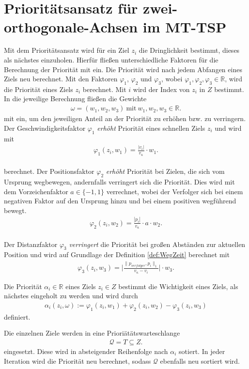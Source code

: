 \documentclass[german,version-2019-11]{uzl-thesis}
\begin{document}
\section{Prioritätsansatz für zwei-orthogonale-Achsen im MT-TSP}

Mit dem Prioritätsansatz wird für ein Ziel $z_i$ die Dringlichkeit bestimmt, dieses als nächstes einzuholen. Hierfür fließen unterschiedliche Faktoren für die Berechnung der Priorität mit ein. Die Priorität wird nach jedem Abfangen eines Ziels neu berechnet. Mit den Faktoren $\varphi_1$, $\varphi_2$ und $\varphi_3$, wobei $\varphi_1,\varphi_2,\varphi_3\in\mathbb{R}$, wird die Priorität eines Ziels $z_i$ berechnet. Mit $i$ wird der Index von $z_i$ in $Z$ bestimmt. In die jeweilige Berechnung fließen die Gewichte
\begin{align*}
\omega = (w_1, w_2 ,w_3)~\text{mit}~w_1,w_2,w_3\in\mathbb{R}.
\end{align*}
mit ein, um den jeweiligen Anteil an der Priorität zu erhöhen bzw. zu verringern.\\
Der Geschwindigkeitsfaktor $\varphi_1$ \emph{erhöht} Priorität eines schnellen Ziels $z_i$ und wird mit 
\begin{align}
\varphi_1(z_i, w_1) = \frac{|v_i|}{v_{\kappa}}\cdot w_1.
\end{align}\\
berechnet.
\label{def:FaktorPos}
Der Positionsfaktor $\varphi_2$ \emph{erhöht} Priorität bei Zielen, die sich vom Ursprung wegbewegen, andernfalls verringert sich die Priorität. Dies wird mit dem Vorzeichenfaktor $a\in\{-1,1\}$ verrechnet, wobei der Verfolger sich bei einem negativen Faktor auf den Ursprung hinzu und bei einem positiven wegführend bewegt.
\begin{align}
\varphi_2(z_i, w_2) = \frac{|p_i|}{v_{\kappa}}\cdot a \cdot w_2.
\end{align}\\
Der Distanzfaktor $\varphi_3$ \emph{verringert} die Priorität bei großen Abständen zur aktuellen Position und wird auf Grundlage der Definition \ref{def:WegZeit} berechnet mit
\begin{align}
\varphi_3(z_i, w_3) = \bigg\vert\frac{\|p_{verfolger},p_i\|_1}{v_{\kappa}-v_i}\bigg\vert \cdot w_3.
\end{align}
\begin{definition}
Die Priorität $\alpha_i\in\mathbb{R}$ eines Ziels $z_i\in Z$ bestimmt die Wichtigkeit eines Ziels, als nächstes eingeholt zu werden und wird durch
\begin{align*}
\alpha_i(z_i, \omega) := \varphi_1(z_i,w_1) + \varphi_2(z_i,w_2) - \varphi_3(z_i,w_3)
\end{align*}
definiert.
\end{definition}\noindent
Die einzelnen Ziele werden in eine Prioriätätswarteschlange
\begin{align*}
\mathcal{Q} = T\subseteq Z.
\end{align*}
eingesetzt. Diese wird in absteigender Reihenfolge nach $\alpha_i$ sotiert. In jeder Iteration wird die Priorität neu berechnet, sodass $\mathcal{Q}$ ebenfalls neu sortiert wird.
\end{document}
